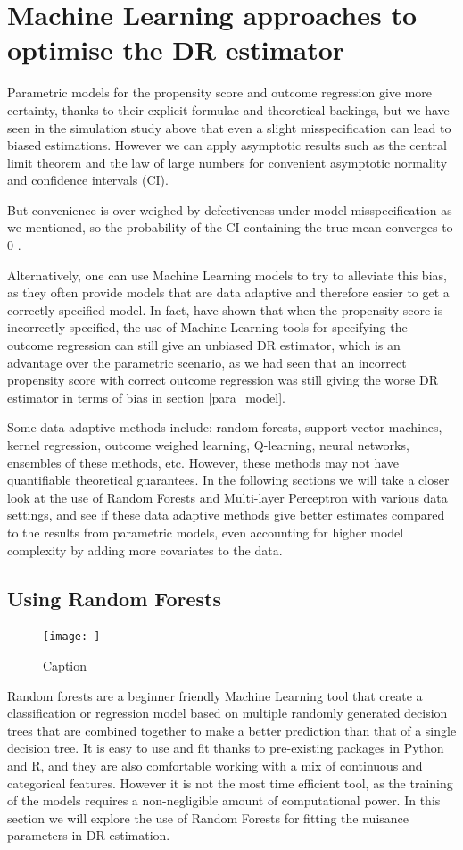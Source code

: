 \documentclass[12pt,twoside]{article}
\begin{document}
\clearpage
\section{Machine Learning approaches to optimise the DR estimator}

Parametric models for the propensity score and outcome regression give more certainty, thanks to their explicit formulae and theoretical backings, but we have seen in the simulation study above that even a slight misspecification can lead to biased estimations. However we can apply asymptotic results such as the central limit theorem and the law of large numbers for convenient asymptotic normality and confidence intervals (CI).

But convenience is over weighed by defectiveness under model misspecification as we mentioned, so the probability of the CI containing the true mean converges to 0 \citep{diaz}.

Alternatively, one can use Machine Learning models to try to alleviate this bias, as they often provide models that are data adaptive and therefore easier to get a correctly specified model. In fact, \citet{ps_SL} have shown that when the propensity score is incorrectly specified, the use of Machine Learning tools for specifying the outcome regression can still give an unbiased DR estimator, which is an advantage over the parametric scenario, as we had seen that an incorrect propensity score with correct outcome regression was still giving the worse DR estimator in terms of bias in section \ref{para_model}.

Some data adaptive methods include: random forests, support vector machines, kernel regression, outcome weighed learning, Q-learning, neural networks, ensembles of these methods, etc. However, these methods may not have quantifiable theoretical guarantees. In the following sections we will take a closer look at the use of Random Forests and Multi-layer Perceptron  with various data settings, and see if these data adaptive methods give better estimates compared to the results from parametric models, even accounting for higher model complexity by adding more covariates to the data.

\subsection{Using Random Forests}
\begin{figure}
    \centering
    \texttt{[image: ]}
    \caption{Caption}
    \label{fig:my_label}
\end{figure}
Random forests are a beginner friendly Machine Learning tool that create a classification or regression model based on multiple randomly generated decision trees that are combined together to make a better prediction than that of a single decision tree. It is easy to use and fit thanks to pre-existing packages in Python and R, and they are also comfortable working with a mix of continuous and categorical features. However it is not the most time efficient tool, as the training of the models requires a non-negligible amount of computational power. In this section we will explore the use of Random Forests for fitting the nuisance parameters in DR estimation.
\end{document}
